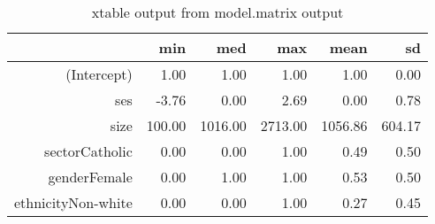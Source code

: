 \begin{table}[H]
\centering
\caption{xtable output from model.matrix output} 
\label{tab:sumry2}
\begin{tabular}{rrrrrr}
  \hline
 & min & med & max & mean & sd \\ 
  \hline
(Intercept) & 1.00 & 1.00 & 1.00 & 1.00 & 0.00 \\ 
  ses & -3.76 & 0.00 & 2.69 & 0.00 & 0.78 \\ 
  size & 100.00 & 1016.00 & 2713.00 & 1056.86 & 604.17 \\ 
  sectorCatholic & 0.00 & 0.00 & 1.00 & 0.49 & 0.50 \\ 
  genderFemale & 0.00 & 1.00 & 1.00 & 0.53 & 0.50 \\ 
  ethnicityNon-white & 0.00 & 0.00 & 1.00 & 0.27 & 0.45 \\ 
   \hline
\end{tabular}
\end{table}
